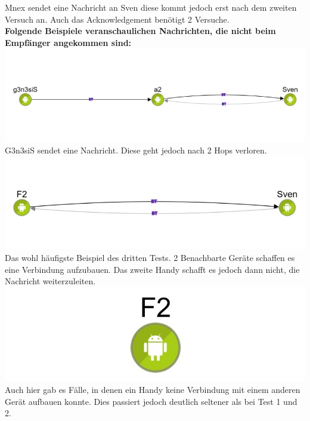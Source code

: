 Mnex sendet eine Nachricht an Sven diese kommt jedoch erst nach dem
zweiten Versuch an. Auch das Acknowledgement benötigt 2 Versuche.
\\
\textbf{Folgende Beispiele veranschaulichen Nachrichten, die nicht beim
Empfänger angekommen sind:}\\

\includegraphics[width=1.0\textwidth]{belege/grosstests/Bilder/Grosstest2/Test3Misserfolg1.jpg}\\
G3n3siS sendet eine Nachricht. Diese geht jedoch nach 2 Hops verloren.\\

\includegraphics[width=1.0\textwidth]{belege/grosstests/Bilder/Grosstest2/Test3Misserfolg2.jpg}\\
Das wohl häufigste Beispiel des dritten Tests. 2 Benachbarte Geräte
schaffen es eine Verbindung aufzubauen. Das zweite Handy schafft es
jedoch dann nicht, die Nachricht weiterzuleiten.\\


\includegraphics[width=1.0\textwidth]{belege/grosstests/Bilder/Grosstest2/Test3Misserfolg3.jpg}\\
Auch hier gab es Fälle, in denen ein Handy keine Verbindung mit einem anderen Gerät aufbauen konnte. Dies passiert jedoch deutlich seltener als bei Test 1 und 2. \\
